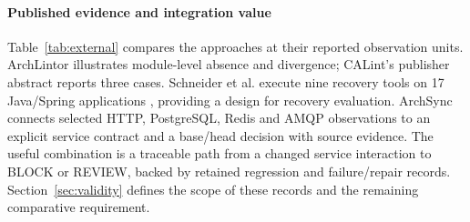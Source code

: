 \paragraph{Published evidence and integration value} Table~\ref{tab:external} compares the approaches at their reported observation units. ArchLintor illustrates module-level absence and divergence; CALint's publisher abstract reports three cases. Schneider et al. execute nine recovery tools on 17 Java/Spring applications \cite{schneider2025comparison}, providing a design for recovery evaluation. ArchSync connects selected HTTP, PostgreSQL, Redis and AMQP observations to an explicit service contract and a base/head decision with source evidence. The useful combination is a traceable path from a changed service interaction to BLOCK or REVIEW, backed by retained regression and failure/repair records. Section~\ref{sec:validity} defines the scope of these records and the remaining comparative requirement.

